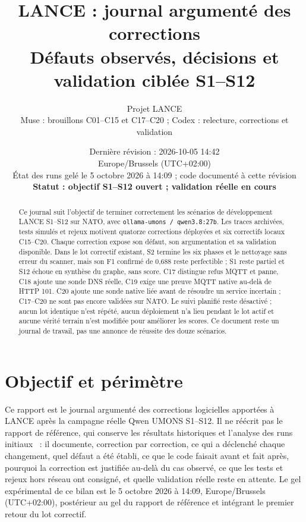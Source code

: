 \documentclass[11pt,a4paper]{article}
\title{LANCE : journal argumenté des corrections\\\large Défauts observés, décisions et validation ciblée S1--S12}
\author{Projet LANCE\\\small Muse : brouillons C01--C15 et C17--C20 ; Codex : relecture, corrections et validation}
\date{Dernière révision : 2026-10-05 14:42\\Europe/Brussels (UTC+02:00)\\État des runs gelé le 5 octobre 2026 à 14:09 ; code documenté à cette révision\\\textbf{Statut : objectif S1--S12 ouvert ; validation réelle en cours}}
\newcommand{\code}[1]{{\urlstyle{tt}\nolinkurl{#1}}}
\begin{document}
\maketitle
\begin{abstract}
Ce journal suit l'objectif de terminer correctement les scénarios de développement LANCE S1--S12 sur NATO, avec \code{ollama-umons / qwen3.8:27b}. Les traces archivées, tests simulés et rejeux motivent quatorze corrections déployées et six correctifs locaux C15--C20. Chaque correction expose son défaut, son argumentation et sa validation disponible. Dans le lot correctif existant, S2 termine les six phases et le nettoyage sans erreur du scanner, mais son F1 confirmé de 0,688 reste perfectible ; S1 reste partiel et S12 échoue en synthèse du graphe, sans score. C17 distingue refus MQTT et panne, C18 ajoute une sonde DNS réelle, C19 exige une preuve MQTT native au-delà de HTTP 101. C20 ajoute une sonde native liée avant de résoudre un service incertain ; C17--C20 ne sont pas encore validées sur NATO. Le suivi planifié reste désactivé ; aucun lot identique n'est répété, aucun déploiement n'a lieu pendant le lot actif et aucune vérité terrain n'est modifiée pour améliorer les scores. Ce document reste un journal de travail, pas une annonce de réussite des douze scénarios.
\end{abstract}
\clearpage
{\small\setlength{\parskip}{0pt}\tableofcontents}
\clearpage
\section{Objectif et périmètre}
\label{sec:objectif-corrections}

Ce rapport est le journal argumenté des corrections logicielles apportées à LANCE après la campagne réelle Qwen UMONS S1--S12. Il ne réécrit pas le rapport de référence, qui conserve les résultats historiques et l'analyse des runs initiaux~\cite{baseline} : il documente, correction par correction, ce qui a déclenché chaque changement, quel défaut a été établi, ce que le code faisait avant et fait après, pourquoi la correction est justifiée au-delà du cas observé, ce que les tests et rejeux hors réseau ont consigné, et quelle validation réelle reste en attente. Le gel expérimental de ce bilan est le 5 octobre 2026 à 14:09, Europe/Brussels (UTC+02:00), postérieur au gel du rapport de référence et intégrant le premier retour du lot correctif.
\end{document}
